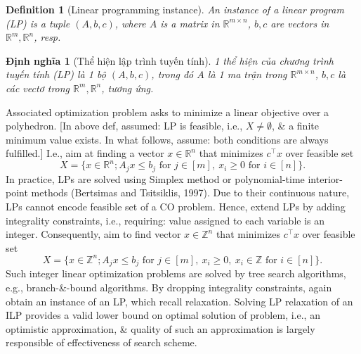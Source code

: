 \documentclass{article}
\newtheorem{definition}{Definition}
\newtheorem{dinhnghia}{Định nghĩa}
\begin{document}
\begin{itemize}
\begin{itemize}
\begin{itemize}
            \begin{definition}[Linear programming instance]
                An instance of a {\rm linear program} (LP) is a tuple $(A,b,c)$, where $A$ is a matrix in $\mathbb{R}^{m\times n}$, $b,c$ are vectors in $\mathbb{R}^m,\mathbb{R}^n$, resp.
            \end{definition}

            \begin{dinhnghia}[Thể hiện lập trình tuyến tính]
                1 thể hiện của {\rm chương trình tuyến tính} (LP) là 1 bộ $(A,b,c)$, trong đó $A$ là 1 ma trận trong $\mathbb{R}^{m\times n}$, $b,c$ là các vectơ trong $\mathbb{R}^m,\mathbb{R}^n$, tương ứng.
            \end{dinhnghia}
            Associated optimization problem asks to minimize a linear objective over a polyhedron. [In above def, assumed: LP is feasible, i.e., $X\ne\emptyset$, \& a finite minimum value exists. In what follows, assume: both conditions are always fulfilled.] I.e., aim at finding a vector $x\in\mathbb{R}^n$ that minimizes $c^\top x$ over feasible set
            \begin{equation*}
                X = \{x\in\mathbb{R}^n;A_jx\le b_j\mbox{ for } j\in[m],\ x_i\ge0\mbox{ for } i\in[n]\}.
            \end{equation*}
            In practice, LPs are solved using Simplex method or polynomial-time interior-point methods (Bertsimas and Tsitsiklis, 1997). Due to their continuous nature, LPs cannot encode feasible set of a CO problem. Hence, extend LPs by adding integrality constraints, i.e., requiring: value assigned to each variable is an integer. Consequently, aim to find vector $x\in\mathbb{Z}^n$ that minimizes $c^\top x$ over feasible set
            \begin{equation*}
                X = \{x\in\mathbb{Z}^n;A_jx\le b_j\mbox{ for } j\in[m],\ x_i\ge0,\ x_i\in\mathbb{Z}\mbox{ for } i\in[n]\}.
            \end{equation*}
            Such integer linear optimization problems are solved by tree search algorithms, e.g., branch-\&-bound algorithms. By dropping integrality constraints, again obtain an instance of an LP, which recall relaxation. Solving LP relaxation of an ILP provides a valid lower bound on optimal solution of problem, i.e., an optimistic approximation, \& quality of such an approximation is largely responsible of effectiveness of search scheme.


\end{itemize}
\end{itemize}
\end{itemize}
\end{document}
